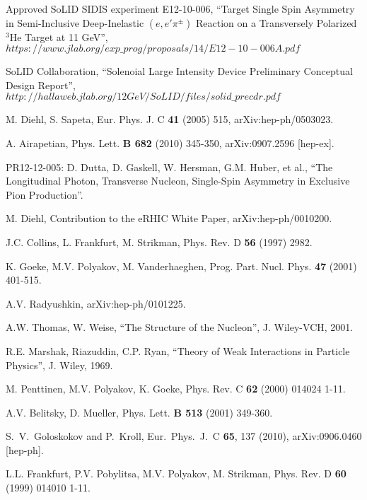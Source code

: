 \clearpage
\begin{thebibliography}{}

  Approved SoLID SIDIS experiment E12-10-006,
  ``Target Single Spin Asymmetry in Semi-Inclusive Deep-Inelastic
  $(e,e'\pi^{\pm})$ Reaction on a Transversely Polarized $\mathrm{^{3}He}$
  Target at 11 GeV'',\\
$https://www.jlab.org/exp\_prog/proposals/14/E12-10-006A.pdf$

  SoLID Collaboration, ``Solenoial Large Intensity Device Preliminary
  Conceptual Design Report'',\\
  $http://hallaweb.jlab.org/12GeV/SoLID/files/solid\_precdr.pdf$
  
 M. Diehl, S. Sapeta, Eur. Phys. J. C {\bf 41} (2005) 515,
  arXiv:hep-ph/0503023.

 A. Airapetian, Phys. Lett. {\bf B 682} (2010) 345-350,
  arXiv:0907.2596 [hep-ex].

 PR12-12-005:
D. Dutta, D. Gaskell, W. Hersman, G.M. Huber, et al., ``The Longitudinal
Photon, Transverse Nucleon, Single-Spin Asymmetry in Exclusive Pion
Production''.

 M. Diehl, Contribution to the eRHIC White Paper,
arXiv:hep-ph/0010200.

 J.C. Collins, L. Frankfurt, M. Strikman, Phys. Rev. D {\bf 56}
  (1997) 2982.

 K. Goeke, M.V. Polyakov, M. Vanderhaeghen,
  Prog. Part. Nucl. Phys. {\bf 47} (2001) 401-515.

 A.V. Radyushkin, arXiv:hep-ph/0101225.

 A.W. Thomas, W. Weise, ``The Structure of the Nucleon'',
  J. Wiley-VCH, 2001.

 R.E. Marshak, Riazuddin, C.P. Ryan, ``Theory of Weak
  Interactions in Particle Physics'', J. Wiley, 1969.

 M. Penttinen, M.V. Polyakov, K. Goeke, Phys. Rev. C {\bf 62}
  (2000) 014024 1-11.

 A.V. Belitsky, D. Mueller, Phys. Lett. {\bf B 513}
  (2001) 349-360.

 S.~V.~Goloskokov and P.~Kroll, Eur.\ Phys.\ J.\ C {\bf 65},
  137 (2010), arXiv:0906.0460 [hep-ph].

 L.L. Frankfurt, P.V. Pobylitsa, M.V. Polyakov, M. Strikman,
  Phys. Rev. D {\bf 60} (1999) 014010 1-11.


\end{thebibliography}
